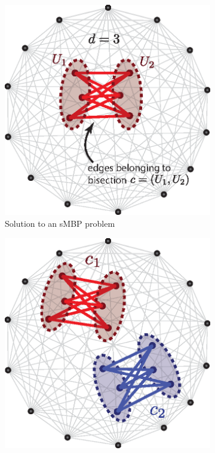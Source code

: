 \begin{figure}[th!]
  \centering
  \begin{subfigure}[b]{.48\textwidth}
      \includegraphics[width=\linewidth]{figures/ch_smbp_and_rem/different_solution_overlaps}
      \caption{Solution to an sMBP problem}
      \label{fig:ch_rem_smbp_illustration-0}
  \end{subfigure}
  \hfill
  \begin{subfigure}[b]{.48\textwidth}
      \includegraphics[width=\linewidth]{figures/ch_smbp_and_rem/different_solution_overlaps_1}

\end{subfigure}
\end{figure}
